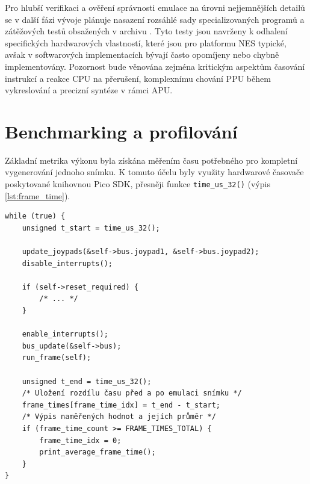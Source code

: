 Pro hlubší verifikaci a ověření správnosti emulace na úrovni nejjemnějších detailů se v další fázi
vývoje plánuje nasazení rozsáhlé sady specializovaných programů a zátěžových testů obsažených v
archivu \cite{nesdev-emulator-tests}. Tyto testy jsou navrženy k odhalení specifických hardwarových
vlastností, které jsou pro platformu NES typické, avšak v softwarových
implementacích bývají často opomíjeny nebo chybně implementovány. Pozornost bude věnována zejména
kritickým aspektům časování instrukcí a reakce CPU na přerušení, komplexnímu chování PPU během
vykreslování a precizní syntéze v rámci APU.

\section{Benchmarking a profilování}

Základní metrika výkonu byla získána měřením času potřebného pro kompletní vygenerování jednoho
snímku. K tomuto účelu byly využity hardwarové časovače poskytované knihovnou Pico SDK,
přesněji funkce \texttt{time\_us\_32()} (výpis \ref{lst:frame_time}).

\begin{listing}[htbp]
\begin{verbatim}
while (true) {
    unsigned t_start = time_us_32();

    update_joypads(&self->bus.joypad1, &self->bus.joypad2);
    disable_interrupts();

    if (self->reset_required) {
        /* ... */
    }

    enable_interrupts();
    bus_update(&self->bus);
    run_frame(self);

    unsigned t_end = time_us_32();
    /* Uložení rozdílu času před a po emulaci snímku */
    frame_times[frame_time_idx] = t_end - t_start;
    /* Výpis naměřených hodnot a jejích průměr */
    if (frame_time_count >= FRAME_TIMES_TOTAL) {
        frame_time_idx = 0;
        print_average_frame_time();
    }
}
\end{verbatim}
\caption{Měření průměrného času, potřebného na emulaci jednoho snímku.}
\label{lst:frame_time}
\end{listing}


